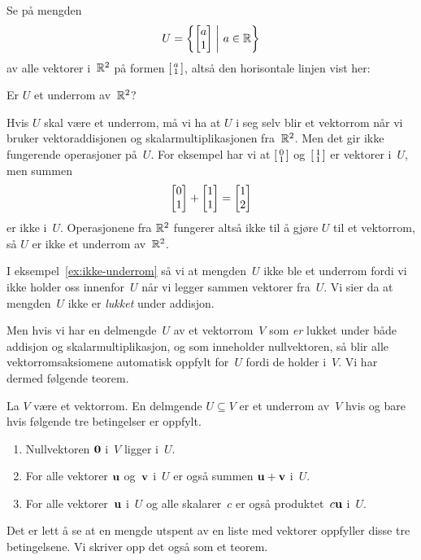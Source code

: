 \begin{ex}
\label{ex:ikke-underrom}
Se på mengden
\[
U = \left\{ \begin{bmatrix} a \\ 1 \end{bmatrix} \;\middle|\ a \in \mathbb{R} \right\}
\]
av alle vektorer i~$\mathbb{R}^2$ på formen $\left[ \begin{smallmatrix} a \\ 1 \end{smallmatrix} \right]$, altså den
horisontale linjen vist her:
\begin{center}
\end{center}
Er $U$ et underrom av~$\mathbb{R}^2$?

Hvis $U$ skal være et underrom, må vi ha at $U$ i seg selv blir et
vektorrom når vi bruker vektoraddisjonen og skalarmultiplikasjonen
fra~$\mathbb{R}^2$.  Men det gir ikke fungerende operasjoner på~$U$.  For
eksempel har vi at $\left[ \begin{smallmatrix} 0 \\ 1 \end{smallmatrix} \right]$ og~$\left[ \begin{smallmatrix} 1 \\ 1 \end{smallmatrix} \right]$ er vektorer i~$U$, men
summen
\[
\begin{bmatrix} 0 \\ 1 \end{bmatrix} + \begin{bmatrix} 1 \\ 1 \end{bmatrix} = \begin{bmatrix} 1 \\ 2 \end{bmatrix}
\]
er ikke i~$U$.  Operasjonene fra $\mathbb{R}^2$ fungerer altså ikke til å
gjøre $U$ til et vektorrom, så $U$ er ikke et underrom av~$\mathbb{R}^2$.
\end{ex}

I eksempel~\ref{ex:ikke-underrom} så vi at mengden~$U$ ikke ble et
underrom fordi vi ikke holder oss innenfor~$U$ når vi legger sammen
vektorer fra~$U$.  Vi sier da at mengden~$U$ ikke er \emph{lukket}
under addisjon.

Men hvis vi har en delmengde~$U$ av et vektorrom~$V$ som \emph{er}
lukket under både addisjon og skalarmultiplikasjon, og som inneholder
nullvektoren, så blir alle vektorromsaksiomene automatisk oppfylt
for~$U$ fordi de holder i~$V$.  Vi har dermed følgende teorem.

\begin{thm}
\label{thm:underrom}
La $V$ være et vektorrom.  En delmgende $U \subseteq V$ er et underrom
av~$V$ hvis og bare hvis følgende tre betingelser er oppfylt.
\begin{enumerate}
\item Nullvektoren $\mathbf{0}$ i~$V$ ligger i~$U$.
\item For alle vektorer $\mathbf{u}$ og~$\mathbf{v}$ i~$U$ er også summen
$\mathbf{u} + \mathbf{v}$ i~$U$.
\item For alle vektorer~$\mathbf{u}$ i~$U$ og alle skalarer~$c$ er også
produktet~$c\mathbf{u}$ i~$U$.
\end{enumerate}
\end{thm}

Det er lett å se at en mengde utspent av en liste med vektorer
oppfyller disse tre betingelsene.  Vi skriver opp det også som et
teorem.

